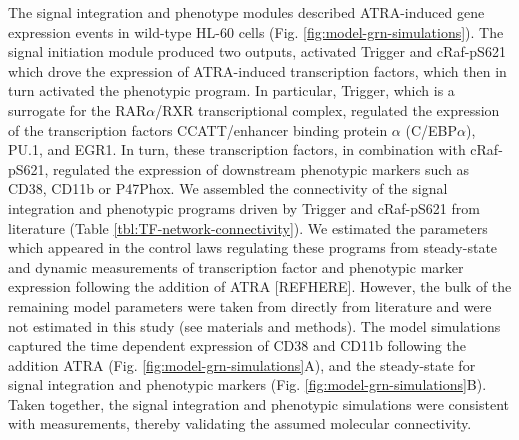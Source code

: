 \documentclass[12pt]{article}
\begin{document}
The signal integration and phenotype modules described ATRA-induced gene expression events in wild-type HL-60 cells (Fig. \ref{fig:model-grn-simulations}).
The signal initiation module produced two outputs, activated Trigger and cRaf-pS621 which drove the expression of ATRA-induced transcription factors,
which then in turn activated the phenotypic program. In particular, Trigger, which is a surrogate for the RAR$\alpha$/RXR transcriptional complex,
regulated the expression of the transcription factors CCATT/enhancer binding protein $\alpha$ (C/EBP$\alpha$), PU.1, and EGR1.
In turn, these transcription factors, in combination with cRaf-pS621, regulated the expression of downstream phenotypic markers such as CD38, CD11b or P47Phox.
We assembled the connectivity of the signal integration and phenotypic programs driven by Trigger and cRaf-pS621 from literature (Table \ref{tbl:TF-network-connectivity}).
We estimated the parameters which appeared in the control laws regulating these programs
from steady-state and dynamic measurements of transcription factor and phenotypic marker expression following the addition of ATRA [REFHERE].
However, the bulk of the remaining model parameters were taken from directly from literature \cite{Milo:2010aa} and were not estimated in this study (see materials and methods).
The model simulations captured the time dependent expression of CD38 and CD11b following the addition ATRA (Fig. \ref{fig:model-grn-simulations}A),
and the steady-state for signal integration and phenotypic markers (Fig. \ref{fig:model-grn-simulations}B).
Taken together, the signal integration and phenotypic simulations were consistent with measurements, thereby validating the assumed molecular connectivity.

\end{document}
